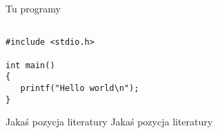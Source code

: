 \documentclass[twoside]{pracaInzynierskaMS}
\begin{document}

Tu programy

\begin{verbatim}

#include <stdio.h>

int main()
{
   printf("Hello world\n");
}
\end{verbatim}       
       
       
       
\begin{thebibliography}{12}

 Jakaś pozycja literatury
 Jakaś pozycja literatury

\end{thebibliography}
\end{document}
